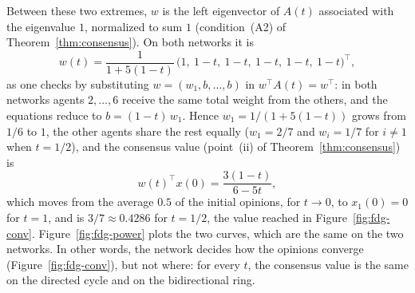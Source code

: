 Between these two extremes, $w$ is the left eigenvector of $A(t)$ associated with the
eigenvalue $1$, normalized to sum $1$ (condition~(A2) of Theorem~\ref{thm:consensus}).
On both networks it is
\[
  w(t) = \frac{1}{1 + 5(1-t)}\,\big(1,\ 1-t,\ 1-t,\ 1-t,\ 1-t,\ 1-t\big)^\top ,
\]
as one checks by substituting $w = (w_1, b, \dots, b)$ in $w^\top A(t) = w^\top$: in
both networks agents $2, \dots, 6$ receive the same total weight from the others, and
the equations reduce to $b = (1-t)\, w_1$. Hence $w_1 = 1/(1 + 5(1-t))$ grows from $1/6$
to $1$, the other agents share the rest equally ($w_1 = 2/7$ and $w_i = 1/7$ for
$i \neq 1$ when $t = 1/2$), and the consensus value (point~(ii) of
Theorem~\ref{thm:consensus}) is
\[
  w(t)^\top x(0) = \frac{3(1-t)}{6 - 5t},
\]
which moves from the average $0.5$ of the initial opinions, for $t \to 0$, to
$x_1(0) = 0$ for $t = 1$, and is $3/7 \approx 0.4286$ for $t = 1/2$, the value reached in
Figure~\ref{fig:fdg-conv}. Figure~\ref{fig:fdg-power} plots the two curves, which are
the same on the two networks.
 In other
words, the network decides how the opinions converge (Figure~\ref{fig:fdg-conv}), but not
where: for every $t$, the consensus value is the same on the directed cycle and on the
bidirectional ring.

